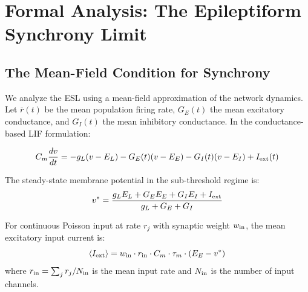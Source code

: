 \documentclass{article}
\begin{document}
\section{Formal Analysis: The Epileptiform Synchrony Limit}
\label{sec:formal}

\subsection{The Mean-Field Condition for Synchrony}

We analyze the ESL using a mean-field approximation of the network dynamics. Let $\bar{r}(t)$ be the mean population firing rate, $G_E(t)$ the mean excitatory conductance, and $G_I(t)$ the mean inhibitory conductance. In the conductance-based LIF formulation:

\begin{equation}
C_m \frac{dv}{dt} = -g_L(v - E_L) - G_E(t)(v - E_E) - G_I(t)(v - E_I) + I_{\rm ext}(t)
\label{eq:conductance}
\end{equation}

The steady-state membrane potential in the sub-threshold regime is:
\begin{equation}
v^* = \frac{g_L E_L + G_E E_E + G_I E_I + I_{\rm ext}}{g_L + G_E + G_I}
\label{eq:vstar}
\end{equation}

For continuous Poisson input at rate $r_j$ with synaptic weight $w_{\rm in}$, the mean excitatory input current is:
\begin{equation}
\langle I_{\rm ext} \rangle = w_{\rm in} \cdot r_{\rm in} \cdot C_m \cdot \tau_m \cdot (E_E - v^*)
\label{eq:iext}
\end{equation}
where $r_{\rm in} = \sum_j r_j / N_{\rm in}$ is the mean input rate and $N_{\rm in}$ is the number of input channels.
\end{document}

